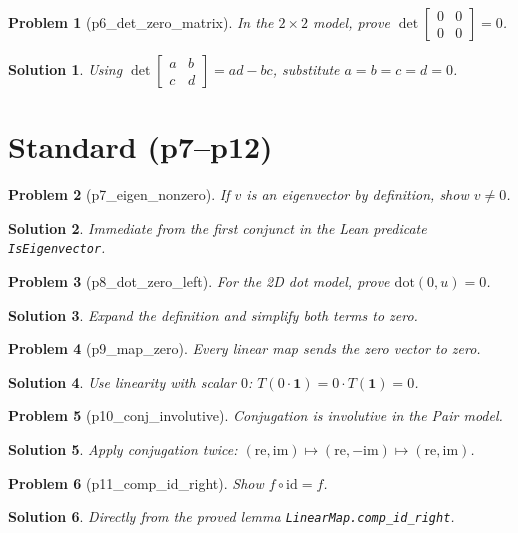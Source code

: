 \documentclass[11pt]{article}
\newtheorem*{problem}{Problem}
\newtheorem*{solution}{Solution}
\begin{document}
\begin{problem}[p6\_det\_zero\_matrix]
In the $2\times2$ model, prove $\det\!\begin{bmatrix}0&0\\0&0\end{bmatrix}=0$.
\end{problem}
\begin{solution}
Using $\det\begin{bmatrix}a&b\\c&d\end{bmatrix}=ad-bc$, substitute $a=b=c=d=0$.
\end{solution}

\section*{Standard (p7--p12)}

\begin{problem}[p7\_eigen\_nonzero]
If $v$ is an eigenvector by definition, show $v\neq0$.
\end{problem}
\begin{solution}
Immediate from the first conjunct in the Lean predicate \texttt{IsEigenvector}.
\end{solution}

\begin{problem}[p8\_dot\_zero\_left]
For the 2D dot model, prove $\mathrm{dot}(0,u)=0$.
\end{problem}
\begin{solution}
Expand the definition and simplify both terms to zero.
\end{solution}

\begin{problem}[p9\_map\_zero]
Every linear map sends the zero vector to zero.
\end{problem}
\begin{solution}
Use linearity with scalar $0$: $T(0\cdot \mathbf{1})=0\cdot T(\mathbf{1})=0$.
\end{solution}

\begin{problem}[p10\_conj\_involutive]
Conjugation is involutive in the Pair model.
\end{problem}
\begin{solution}
Apply conjugation twice: $(\mathrm{re},\mathrm{im})\mapsto(\mathrm{re},-\mathrm{im})\mapsto(\mathrm{re},\mathrm{im})$.
\end{solution}

\begin{problem}[p11\_comp\_id\_right]
Show $f\circ \mathrm{id}=f$.
\end{problem}
\begin{solution}
Directly from the proved lemma \texttt{LinearMap.comp\_id\_right}.
\end{solution}
\end{document}
